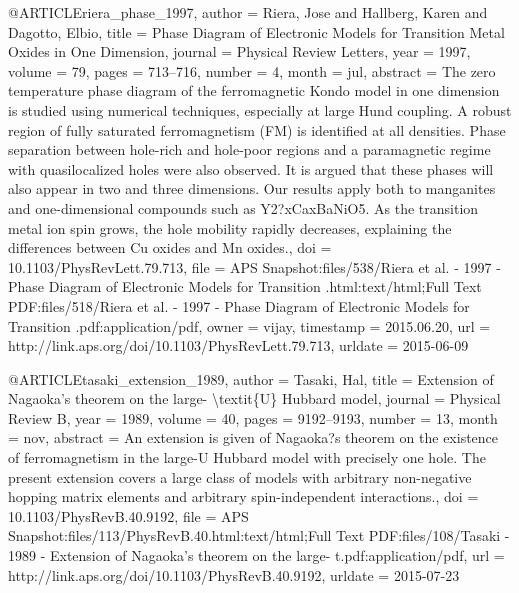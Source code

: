 @ARTICLE{riera_phase_1997,
  author = {Riera, Jose and Hallberg, Karen and Dagotto, Elbio},
  title = {Phase {Diagram} of {Electronic} {Models} for {Transition} {Metal}
	{Oxides} in {One} {Dimension}},
  journal = {Physical Review Letters},
  year = {1997},
  volume = {79},
  pages = {713--716},
  number = {4},
  month = jul,
  abstract = {The zero temperature phase diagram of the ferromagnetic Kondo model
	in one dimension is studied using numerical techniques, especially
	at large Hund coupling. A robust region of fully saturated ferromagnetism
	(FM) is identified at all densities. Phase separation between hole-rich
	and hole-poor regions and a paramagnetic regime with quasilocalized
	holes were also observed. It is argued that these phases will also
	appear in two and three dimensions. Our results apply both to manganites
	and one-dimensional compounds such as Y2?xCaxBaNiO5. As the transition
	metal ion spin grows, the hole mobility rapidly decreases, explaining
	the differences between Cu oxides and Mn oxides.},
  doi = {10.1103/PhysRevLett.79.713},
  file = {APS Snapshot:files/538/Riera et al. - 1997 - Phase Diagram of Electronic Models for Transition .html:text/html;Full Text PDF:files/518/Riera et al. - 1997 - Phase Diagram of Electronic Models for Transition .pdf:application/pdf},
  owner = {vijay},
  timestamp = {2015.06.20},
  url = {http://link.aps.org/doi/10.1103/PhysRevLett.79.713},
  urldate = {2015-06-09}
}

@ARTICLE{tasaki_extension_1989,
  author = {Tasaki, Hal},
  title = {Extension of {Nagaoka}'s theorem on the large- {\textbackslash}textit\{{U}\}
	{Hubbard} model},
  journal = {Physical Review B},
  year = {1989},
  volume = {40},
  pages = {9192--9193},
  number = {13},
  month = nov,
  abstract = {An extension is given of Nagaoka?s theorem on the existence of ferromagnetism
	in the large-U Hubbard model with precisely one hole. The present
	extension covers a large class of models with arbitrary non-negative
	hopping matrix elements and arbitrary spin-independent interactions.},
  doi = {10.1103/PhysRevB.40.9192},
  file = {APS Snapshot:files/113/PhysRevB.40.html:text/html;Full Text PDF:files/108/Tasaki - 1989 -    Extension of Nagaoka's theorem on the large-    t.pdf:application/pdf},
  url = {http://link.aps.org/doi/10.1103/PhysRevB.40.9192},
  urldate = {2015-07-23}
}


